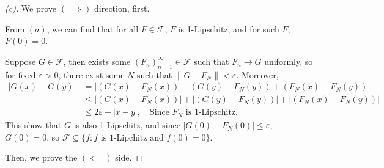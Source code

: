 \begin{proof}[(c)]
    We prove $(\implies)$ direction, first.
    
    From $(a)$, we can find that for all $F \in \mathcal F$, $F$ is 1-Lipschitz, and for such $F$, $F(0) = 0$.

    Suppose $G \in \overline{\mathcal F}$, then exists some $(F_n)_{n=1}^\infty \in \mathcal F$ such that $F_n \to G$ uniformly, so for fixed $\varepsilon > 0$, there exist some $N$ such that $\| G- F_N\| < \varepsilon$. Moreover, 
    \[
        \begin{aligned}
            \lvert G(x) - G(y)\rvert &= \lvert (G(x) - F_N(x)) - (G(y)-F_N(y)) + (F_N(x) - F_N(y))\rvert \\
            &\le \lvert (G(x) - F_N(x))\rvert + \lvert (G(y) - F_N(y))\rvert + \lvert (F_N(x) - F_N(y))\rvert \\
            &\le 2\varepsilon + \lvert x - y\rvert, \quad \text{Since $F_N$ is 1-Lipschitz.}
        \end{aligned}
    \]
    This show that $G$ is also 1-Lipschitz, and since $\lvert G(0) - F_N(0)\rvert \le \varepsilon$, $G(0) = 0$, so $\overline{\mathcal F} \subseteq \{f : f\text{ is 1-Lipchitz and $f(0) = 0$}\}$.

    Then, we prove the $( \impliedby )$ side.


\end{proof}

